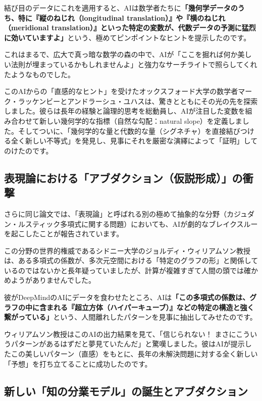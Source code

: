 結び目のデータにこれを適用すると、AIは数学者たちに\textbf{「幾何学データのうち、特に『縦のねじれ（longitudinal translation）』や『横のねじれ（meridional translation）』といった特定の変数が、代数データの予測に猛烈に効いていますよ」}という、極めてピンポイントなヒントを提示したのです。

これはまるで、広大で真っ暗な数学の森の中で、AIが「ここを掘れば何か美しい法則が埋まっているかもしれませんよ」と強力なサーチライトで照らしてくれたようなものでした。

このAIからの「直感的なヒント」を受けたオックスフォード大学の数学者マーク・ラッケンビーとアンドラーシュ・ユハスは、驚きとともにその光の先を探索しました。彼らは長年の経験と論理的思考を総動員し、AIが注目した変数を組み合わせて新しい幾何学的な指標（自然な勾配：natural slope）を定義しました。そしてついに、「幾何学的な量と代数的な量（シグネチャ）を直接結びつける全く新しい不等式」を発見し、見事にそれを厳密な演繹によって「証明」してのけたのです。

\subsection{表現論における「アブダクション（仮説形成）」の衝撃}

さらに同じ論文では、「表現論」と呼ばれる別の極めて抽象的な分野（カジュダン・ルスティック多項式に関する問題）においても、AIが劇的なブレイクスルーを起こしたことが報告されています。

この分野の世界的権威であるシドニー大学のジョルディ・ウィリアムソン教授は、ある多項式の係数が、多次元空間における「特定のグラフの形」と関係しているのではないかと長年疑っていましたが、計算が複雑すぎて人間の頭では確かめようがありませんでした。

彼がDeepMindのAIにデータを食わせたところ、AIは\textbf{「この多項式の係数は、グラフの中に含まれる『超立方体（ハイパーキューブ）』などの特定の構造と強く繋がっている」}という、人間離れしたパターンを見事に抽出してみせたのです。

ウィリアムソン教授はこのAIの出力結果を見て、「信じられない！ まさにこういうパターンがあるはずだと夢見ていたんだ」と驚嘆しました。彼はAIが提示したこの美しいパターン（直感）をもとに、長年の未解決問題に対する全く新しい「予想」を打ち立てることに成功したのです。

\subsection{新しい「知の分業モデル」の誕生とアブダクション}

